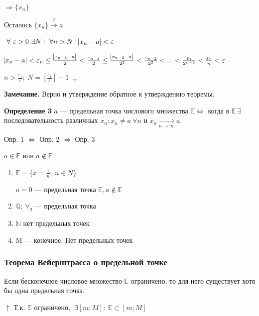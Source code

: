 \documentclass{article}
\begin{document}
  \(\Rightarrow \{x_n\}\)

  Осталось \(\{x_n\} \xrightarrow[]{\textrm{?}} a\)

  \(\ \forall\ \varepsilon > 0\ \exists N:\ \forall n > N: \abs{x_n - a} < \varepsilon\)

  \(\abs{x_n - a} < \varepsilon_n \leq \frac{\abs{x_{n-1}-a}}{2} < \frac{\varepsilon_{n-1}}{2} \leq \frac{\abs{x_{n-2}-a}}{2^2} < \frac{\varepsilon_{n-2}}{2^2} < ... < \frac{\varepsilon_{1}}{2^{n-1}} < \frac{\varepsilon_1}{n} < \varepsilon\)

  \(n > \frac{\varepsilon_1}{\varepsilon};\ N=[\frac{\varepsilon_1}{\varepsilon}] + 1\)
  \(\downarrow\)

  \textbf{Замечание.} Верно и утверждение обратное к утверждению теоремы.

  \textbf{Определение 3} \(a\) --- предельная точка числового множества \(\mathbb{E} \Leftrightarrow\) когда в \(\mathbb{E}\ \exists\) последовательность различных \(x_n: x_n \neq a\ \forall n\) и \(x_n \xrightarrow[n \rightarrow \infty]{} a\).

  Опр. 1 \(\Leftrightarrow\) Опр. 2 \(\Leftrightarrow\) Опр. 3

  \(a \in \mathbb{E}\) или \(a \not\in \mathbb{E}\)

  \begin{enumerate}
      \item \(\mathbb{E} = \{x=\frac{1}{n};\ n \in N\}\)

      \(a = 0\) --- предельная точка \(\mathbb{E}, a \not \in \mathbb{E}\)

      \item \(\mathbb{Q};\ \forall_q\) --- предельная точка

      \item \(\mathbb{N}\) нет предельных точек

      \item M --- конечное. Нет предельных точек
  \end{enumerate}

  \subsubsection{Теорема Вейерштрасса о предельной точке}
  Если бесконечное числовое множество \(\mathbb{E}\) ограничено, то для него существует хотя бы одна предельная точка.

  \(\uparrow\) Т.к. \(\mathbb{E}\) ограничено, \(\ \exists [m; M]:\ \mathbb{E} \subset  [m; M]\)
\end{document}
